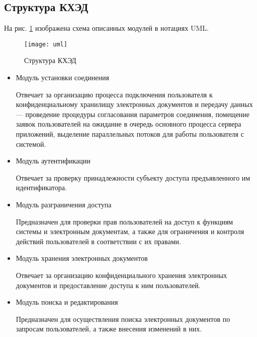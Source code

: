 \subsection{Структура КХЭД} \label{storage}

На рис. \ref{img:uml} изображена схема описанных модулей в нотациях UML.

\begin{figure}[p]
  \centering
  \texttt{[image: uml]}
  \caption{Структура КХЭД}
  \label{img:uml}
\end{figure}

\begin{itemize}
\item Модуль установки соединения

Отвечает за организацию процесса подключения пользователя к конфиденциальному хранилищу электронных документов и передачу данных --- проведение процедуры согласования параметров соединения, помещение заявок пользователей на ожидание в очередь основного процесса сервера приложений, выделение параллельных потоков для работы пользователя с системой.

\item Модуль аутентификации

Отвечает за проверку принадлежности субъекту доступа предъявленного им идентификатора.

\item Модуль разграничения доступа

Предназначен для проверки прав пользователей на доступ к функциям системы и электронным документам, а также для ограничения и контроля действий пользователей в соответствии с их правами.

\item Модуль хранения электронных документов

Отвечает за организацию конфиденциального хранения электронных документов и предоставление доступа к ним пользователей.

\item Модуль поиска и редактирования

Предназначен для осуществления поиска электронных документов по запросам пользователей, а также внесения изменений в них.

\end{itemize}